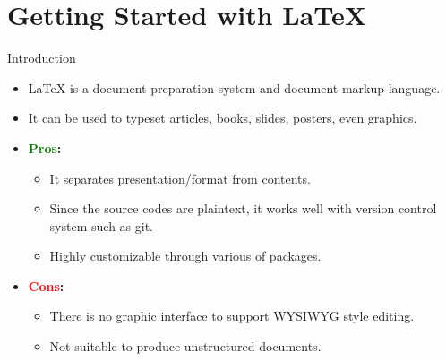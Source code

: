 \section{Getting Started with \LaTeX}

{

\begin{frame}{Introduction}
  \begin{itemize}
    \item \alert{\LaTeX{}} is a document preparation system and document markup language.
    \item It can be used to typeset articles, books, slides, posters, even graphics.
    \item \textbf{\textcolor{Green}{Pros}:}
          \begin{itemize}
            \item It separates presentation/format from contents.
            \item Since the source codes are plaintext, it works well with version control system such as git.
            \item Highly customizable through various of packages.
          \end{itemize}
    \item \textbf{\textcolor{Red}{Cons}:}
          \begin{itemize}
            \item There is no graphic interface to support WYSIWYG style editing.
            \item Not suitable to produce unstructured documents.
          \end{itemize}
  \end{itemize}
\end{frame}
}

